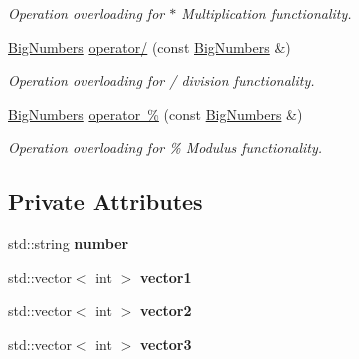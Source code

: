 \begin{DoxyCompactItemize}
\begin{DoxyCompactList}\small\item\em Operation overloading for $\ast$ Multiplication functionality. \end{DoxyCompactList}\item 
\mbox{\hyperlink{class_big_numbers_namespace_1_1_big_numbers}{Big\+Numbers}} \mbox{\hyperlink{class_big_numbers_namespace_1_1_big_numbers_ac2798a7517787c6b9609256e685ddc01}{operator/}} (const \mbox{\hyperlink{class_big_numbers_namespace_1_1_big_numbers}{Big\+Numbers}} \&)
\begin{DoxyCompactList}\small\item\em Operation overloading for / division functionality. \end{DoxyCompactList}\item 
\mbox{\hyperlink{class_big_numbers_namespace_1_1_big_numbers}{Big\+Numbers}} \mbox{\hyperlink{class_big_numbers_namespace_1_1_big_numbers_a568d0045db0873c7ac775b8e3c68505e}{operator \%}} (const \mbox{\hyperlink{class_big_numbers_namespace_1_1_big_numbers}{Big\+Numbers}} \&)
\begin{DoxyCompactList}\small\item\em Operation overloading for \% Modulus functionality. \end{DoxyCompactList}\end{DoxyCompactItemize}
\subsection*{Private Attributes}
\begin{DoxyCompactItemize}
\item 
\mbox{\label{class_big_numbers_namespace_1_1_big_numbers_a77c0131eed74e09807c7867ef708836c}} 
std\+::string {\bfseries number}
\item 
\mbox{\label{class_big_numbers_namespace_1_1_big_numbers_a7a25459fa6e6090805ec2b9d69f423fa}} 
std\+::vector$<$ int $>$ {\bfseries vector1}
\item 
\mbox{\label{class_big_numbers_namespace_1_1_big_numbers_a4f3c1cb1fb0cf3777b70522581356a8b}} 
std\+::vector$<$ int $>$ {\bfseries vector2}
\item 
\mbox{\label{class_big_numbers_namespace_1_1_big_numbers_a9b58891dab418d1700fcef698d3a7a41}} 
std\+::vector$<$ int $>$ {\bfseries vector3}
\end{DoxyCompactItemize}


